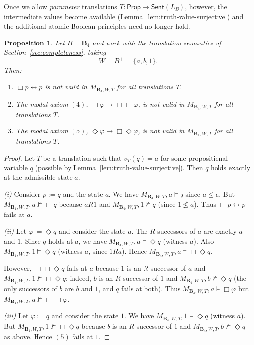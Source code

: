 \documentclass[11pt]{amsart}
\theoremstyle{definition}
\theoremstyle{plain}
\newtheorem{proposition}[definition]{Proposition}
\newcommand{\Prop}{\mathsf{Prop}}
\newcommand{\Sent}{\mathsf{Sent}}
\newcommand{\LB}{L_B}     %
\newcommand{\Bfour}{\mathbf{B}_4}
\begin{document}
Once we allow \emph{parameter} translations $T:\Prop\to\Sent(\LB)$, however, the intermediate values become
available (Lemma~\ref{lem:truth-value-surjective}) and the additional atomic-Boolean principles need no longer hold.

\begin{proposition}\label{prop:B4-refute-collapse}
Let $B=\Bfour$ and work with the translation semantics of Section~\ref{sec:completeness}, taking
\[
W=B^+=\{a,b,1\}.
\]
Then:
\begin{enumerate}[label=(\roman*)]
\item $\Box p\leftrightarrow p$ is \emph{not} valid in $M_{\Bfour,W,T}$ for all translations $T$.
\item The modal axiom $(4)$, $\Box\varphi\to\Box\Box\varphi$, is \emph{not} valid in $M_{\Bfour,W,T}$ for all
translations $T$.
\item The modal axiom $(5)$, $\Diamond\varphi\to\Box\Diamond\varphi$, is \emph{not} valid in $M_{\Bfour,W,T}$ for all
translations $T$.
\end{enumerate}
\end{proposition}

\begin{proof}
Let $T$ be a translation such that $v_T(q)=a$ for some propositional variable $q$ (possible by
Lemma~\ref{lem:truth-value-surjective}).
Then $q$ holds exactly at the admissible state $a$.

\smallskip\noindent\emph{(i)} Consider $p:=q$ and the state $a$.
We have $M_{\Bfour,W,T},a\models q$ since $a\le a$.
But $M_{\Bfour,W,T},a\not\models \Box q$ because $aR1$ and $M_{\Bfour,W,T},1\not\models q$
(since $1\not\le a$).
Thus $\Box p\leftrightarrow p$ fails at $a$.

\smallskip\noindent\emph{(ii)} Let $\varphi:=\Diamond q$ and consider the state $a$.
The $R$-successors of $a$ are exactly $a$ and $1$.
Since $q$ holds at $a$, we have $M_{\Bfour,W,T},a\models \Diamond q$ (witness $a$).
Also $M_{\Bfour,W,T},1\models \Diamond q$ (witness $a$, since $1Ra$).
Hence $M_{\Bfour,W,T},a\models \Box\Diamond q$.

However, $\Box\Box\Diamond q$ fails at $a$ because $1$ is an $R$-successor of $a$ and
$M_{\Bfour,W,T},1\not\models \Box\Diamond q$:
indeed, $b$ is an $R$-successor of $1$ and $M_{\Bfour,W,T},b\not\models \Diamond q$
(the only successors of $b$ are $b$ and $1$, and $q$ fails at both).
Thus $M_{\Bfour,W,T},a\models \Box\varphi$ but $M_{\Bfour,W,T},a\not\models \Box\Box\varphi$.

\smallskip\noindent\emph{(iii)} Let $\varphi:=q$ and consider the state $1$.
We have $M_{\Bfour,W,T},1\models \Diamond q$ (witness $a$).
But $M_{\Bfour,W,T},1\not\models \Box\Diamond q$ because $b$ is an $R$-successor of $1$ and
$M_{\Bfour,W,T},b\not\models \Diamond q$ as above.
Hence $(5)$ fails at $1$.
\end{proof}
\end{document}
